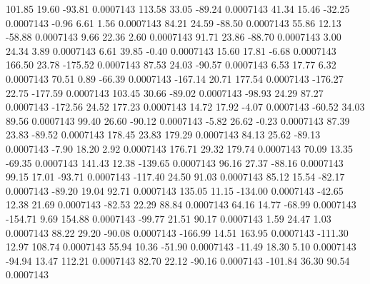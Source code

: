       101.85       19.60      -93.81     0.0007143
      113.58       33.05      -89.24     0.0007143
       41.34       15.46      -32.25     0.0007143
       -0.96        6.61        1.56     0.0007143
       84.21       24.59      -88.50     0.0007143
       55.86       12.13      -58.88     0.0007143
        9.66       22.36        2.60     0.0007143
       91.71       23.86      -88.70     0.0007143
        3.00       24.34        3.89     0.0007143
        6.61       39.85       -0.40     0.0007143
       15.60       17.81       -6.68     0.0007143
      166.50       23.78     -175.52     0.0007143
       87.53       24.03      -90.57     0.0007143
        6.53       17.77        6.32     0.0007143
       70.51        0.89      -66.39     0.0007143
     -167.14       20.71      177.54     0.0007143
     -176.27       22.75     -177.59     0.0007143
      103.45       30.66      -89.02     0.0007143
      -98.93       24.29       87.27     0.0007143
     -172.56       24.52      177.23     0.0007143
       14.72       17.92       -4.07     0.0007143
      -60.52       34.03       89.56     0.0007143
       99.40       26.60      -90.12     0.0007143
       -5.82       26.62       -0.23     0.0007143
       87.39       23.83      -89.52     0.0007143
      178.45       23.83      179.29     0.0007143
       84.13       25.62      -89.13     0.0007143
       -7.90       18.20        2.92     0.0007143
      176.71       29.32      179.74     0.0007143
       70.09       13.35      -69.35     0.0007143
      141.43       12.38     -139.65     0.0007143
       96.16       27.37      -88.16     0.0007143
       99.15       17.01      -93.71     0.0007143
     -117.40       24.50       91.03     0.0007143
       85.12       15.54      -82.17     0.0007143
      -89.20       19.04       92.71     0.0007143
      135.05       11.15     -134.00     0.0007143
      -42.65       12.38       21.69     0.0007143
      -82.53       22.29       88.84     0.0007143
       64.16       14.77      -68.99     0.0007143
     -154.71        9.69      154.88     0.0007143
      -99.77       21.51       90.17     0.0007143
        1.59       24.47        1.03     0.0007143
       88.22       29.20      -90.08     0.0007143
     -166.99       14.51      163.95     0.0007143
     -111.30       12.97      108.74     0.0007143
       55.94       10.36      -51.90     0.0007143
      -11.49       18.30        5.10     0.0007143
      -94.94       13.47      112.21     0.0007143
       82.70       22.12      -90.16     0.0007143
     -101.84       36.30       90.54     0.0007143
